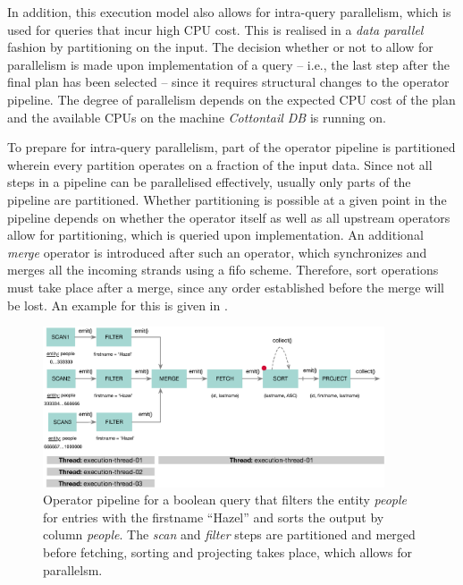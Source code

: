 In addition, this execution model also allows for intra-query parallelism, which is used for queries that incur high CPU cost. This is realised in a \emph{data parallel} fashion by partitioning on the input. The decision whether or not to allow for parallelism is made upon implementation of a query -- i.e., the last step after the final plan has been selected -- since it requires structural changes to the operator pipeline. The degree of parallelism depends on the expected CPU cost of the plan and the available CPUs on the machine \emph{Cottontail DB} is running on.

To prepare for intra-query parallelism, part of the operator pipeline is partitioned wherein every partition operates on a fraction of the input data. Since not all steps in a pipeline can be parallelised effectively, usually only parts of the pipeline are partitioned. Whether partitioning is possible at a given point in the pipeline depends on whether the operator itself as well as all upstream operators allow for partitioning, which is queried upon implementation. An additional \emph{merge} operator is introduced after such an operator, which synchronizes and merges all the incoming strands using a \acrshort{fifo} scheme. Therefore, sort operations must take place after a merge, since any order established before the merge will be lost. An example for this is given in .

\begin{figure}[bt]
    \centering
    \includegraphics[width=0.9\textwidth]{figures/execution-model-parallel}
    \caption{Operator pipeline for a boolean query that filters the entity \emph{people} for entries with the firstname ``Hazel'' and sorts the output by column \emph{people}. The \emph{scan} and \emph{filter} steps are partitioned and merged before fetching, sorting and projecting takes place, which allows for parallelsm.}
    \label{figure:cottontail_execution_model_parallel}
\end{figure}

